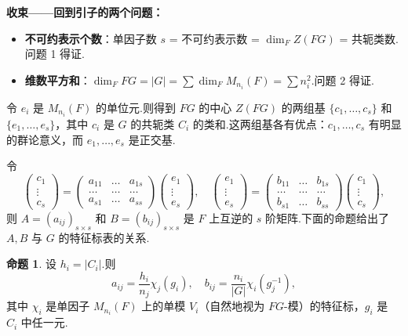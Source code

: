 \documentclass[11pt,a4paper]{article}
\theoremstyle{plain}
\theoremstyle{definition}
\newtheorem{prop}[thm]{命题}
\begin{document}
\noindent \textbf{收束——回到引子的两个问题：}
\begin{itemize}
    \item \textbf{不可约表示个数}：单因子数 $s$ = 不可约表示数 = $\dim_F Z(FG)$ = 共轭类数.问题 1 得证.
    \item \textbf{维数平方和}：$\dim_F FG = |G| = \sum \dim_F M_{n_i}(F) = \sum n_i^2$.问题 2 得证.
\end{itemize}


令 $e_i$ 是 $M_{n_i}(F)$ 的单位元.则得到 $FG$ 的中心 $Z(FG)$ 的两组基 $\{c_1, \dots, c_s\}$ 和 $\{e_1, \dots, e_s\}$，其中 $c_i$ 是 $G$ 的共轭类 $C_i$ 的类和.这两组基各有优点：$c_1, \dots, c_s$ 有明显的群论意义，而 $e_1, \dots, e_s$ 是正交基.

令
$$
\begin{pmatrix} c_1 \\ \vdots \\ c_s \end{pmatrix}
= \begin{pmatrix}
a_{11} & \dots & a_{1s} \\
\dots & \dots & \dots \\
a_{s1} & \dots & a_{ss}
\end{pmatrix}
\begin{pmatrix} e_1 \\ \vdots \\ e_s \end{pmatrix}, \quad
\begin{pmatrix} e_1 \\ \vdots \\ e_s \end{pmatrix}
= \begin{pmatrix}
b_{11} & \dots & b_{1s} \\
\dots & \dots & \dots \\
b_{s1} & \dots & b_{ss}
\end{pmatrix}
\begin{pmatrix} c_1 \\ \vdots \\ c_s \end{pmatrix},
$$
则 $A = (a_{ij})_{s \times s}$ 和 $B = (b_{ij})_{s \times s}$ 是 $F$ 上互逆的 $s$ 阶矩阵.下面的命题给出了 $A, B$ 与 $G$ 的特征标表的关系.

\begin{prop}
设 $h_i = |C_i|$.则
$$
a_{ij} = \frac{h_i}{n_j} \chi_j(g_i), \quad b_{ij} = \frac{n_i}{|G|} \chi_i(g_j^{-1}),
$$
其中 $\chi_i$ 是单因子 $M_{n_i}(F)$ 上的单模 $V_i$（自然地视为 $FG$-模）的特征标，$g_i$ 是 $C_i$ 中任一元.
\end{prop}
\end{document}

